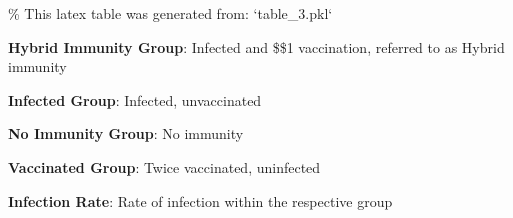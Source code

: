 \documentclass[11pt]{article}
\begin{document}
\begin{codeoutput}
\% This latex table was generated from: `table\_3.pkl`
\begin{table}[h]
\caption{Distribution of infection events by vaccination group}
\label{table:table3InfectionDistribution}
\begin{threeparttable}
\renewcommand{\TPTminimum}{\linewidth}
\begin{tablenotes}
\footnotesize
\item \textbf{Hybrid Immunity Group}: Infected and \$\geq\$1 vaccination, referred to as Hybrid immunity
\item \textbf{Infected Group}: Infected, unvaccinated
\item \textbf{No Immunity Group}: No immunity
\item \textbf{Vaccinated Group}: Twice vaccinated, uninfected
\item \textbf{Infection Rate}: Rate of infection within the respective group
\end{tablenotes}
\end{threeparttable}
\end{table}
\end{codeoutput}
\end{document}
